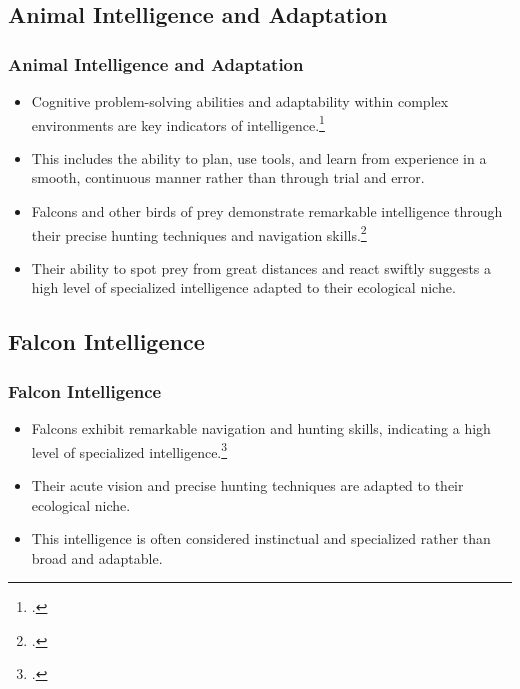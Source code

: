 \documentclass[10pt]{beamer}
\begin{document}
\subsection{Animal Intelligence and Adaptation}
\begin{frame}
    \frametitle{Animal Intelligence and Adaptation}
    \begin{itemize}
        \item Cognitive problem-solving abilities and adaptability within complex environments are key indicators of intelligence.\footcite{zuberbuhler2000cognitive}
        \item This includes the ability to plan, use tools, and learn from experience in a smooth, continuous manner rather than through trial and error.
        \item Falcons and other birds of prey demonstrate remarkable intelligence through their precise hunting techniques and navigation skills.\footcite{emery2004cognitive}
        \item Their ability to spot prey from great distances and react swiftly suggests a high level of specialized intelligence adapted to their ecological niche.
    \end{itemize}
\end{frame}

\subsection{Falcon Intelligence}
\begin{frame}
    \frametitle{Falcon Intelligence}
    \begin{itemize}
        \item Falcons exhibit remarkable navigation and hunting skills, indicating a high level of specialized intelligence.\footcite{ratcliffe2007predation}
        \item Their acute vision and precise hunting techniques are adapted to their ecological niche.
        \item This intelligence is often considered instinctual and specialized rather than broad and adaptable.
    \end{itemize}
\end{frame}
\end{document}
